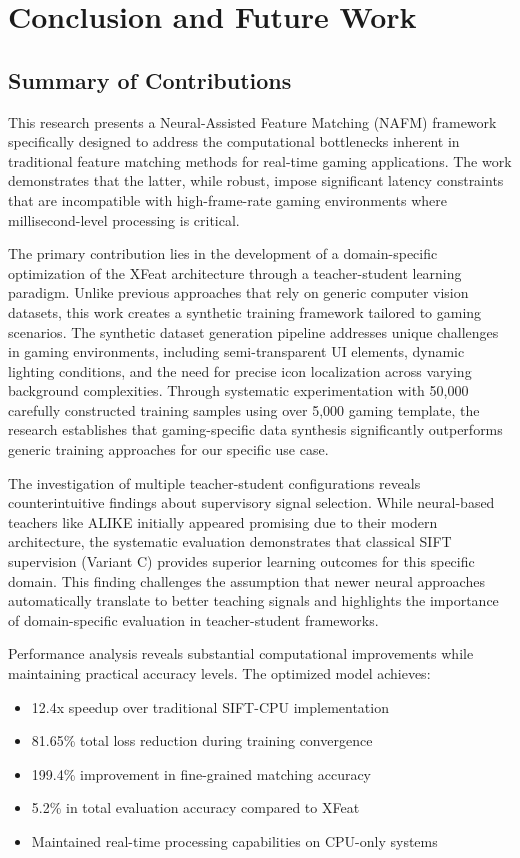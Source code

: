 \chapter{Conclusion and Future Work}
\section{Summary of Contributions}

This research presents a Neural-Assisted Feature Matching (NAFM) framework
specifically designed to address the computational bottlenecks inherent in
traditional feature matching methods for real-time gaming applications. The
work demonstrates that the latter, while robust, impose significant latency
constraints that are incompatible with high-frame-rate gaming environments
where millisecond-level processing is critical.

The primary contribution lies in the development of a domain-specific
optimization of the XFeat architecture through a teacher-student learning
paradigm. Unlike previous approaches that rely on generic computer vision
datasets, this work creates a synthetic training framework tailored to gaming
scenarios. The synthetic dataset generation pipeline addresses unique
challenges in gaming environments, including semi-transparent UI elements,
dynamic lighting conditions, and the need for precise icon localization across
varying background complexities. Through systematic experimentation with 50,000
carefully constructed training samples using over 5,000 gaming template, the
research establishes that gaming-specific data synthesis significantly
outperforms generic training approaches for our specific use case.

The investigation of multiple teacher-student configurations reveals
counterintuitive findings about supervisory signal selection. While
neural-based teachers like ALIKE initially appeared promising due to their
modern architecture, the systematic evaluation demonstrates that classical SIFT
supervision (Variant C) provides superior learning outcomes for this specific
domain. This finding challenges the assumption that newer neural approaches
automatically translate to better teaching signals and highlights the
importance of domain-specific evaluation in teacher-student frameworks.

Performance analysis reveals substantial computational improvements while
maintaining practical accuracy levels. The optimized model achieves:
\begin{itemize}
    \item 12.4x speedup over traditional SIFT-CPU implementation
    \item 81.65\% total loss reduction during training convergence
    \item 199.4\% improvement in fine-grained matching accuracy
    \item 5.2\% in total evaluation accuracy compared to XFeat
    \item Maintained real-time processing capabilities on CPU-only systems
\end{itemize}

